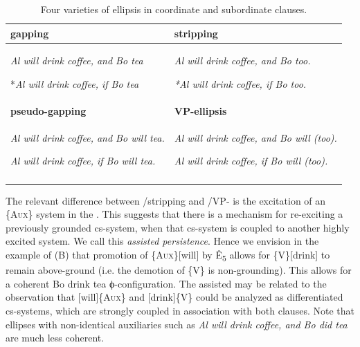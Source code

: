   
  
\begin{table}
\begin{tabularx}{\textwidth}{XX}
\lsptoprule
\textbf{gapping} & \textbf{stripping}\\
\midrule 

\textit{Al will drink coffee, and Bo tea}

*\textit{Al will drink coffee, if Bo tea} & \textit{Al will drink coffee, and Bo too.}

\textit{*Al will drink coffee, if Bo too.}  \\
\tablevspace

\textbf{pseudo-gapping} & \textbf{VP-ellipsis}\\
\midrule 
\textit{Al will drink coffee, and Bo will tea.}

\textit{Al will drink coffee, if Bo will tea.} & \textit{Al will drink coffee, and Bo will (too).}

\textit{Al will drink coffee, if Bo will (too).}\\
\lspbottomrule
\end{tabularx}
\caption{Four varieties of ellipsis in coordinate and subordinate clauses.}\label{tab:7:1}
\end{table}

  The relevant difference between /stripping and /VP- is the excitation of an \{A\textsc{ux}\} system in the . This suggests that there is a mechanism for re-exciting a previously grounded cs-system, when that cs-system is coupled to another highly excited system. We call this \textit{assisted persistence}. Hence we envision in the  example of {}(B) that promotion of \{A\textsc{ux}\}[will] by Ê\textsubscript{5} allows for \{V\}[drink] to remain above-ground (i.e. the demotion of \{V\} is non-grounding). This allows for a coherent {\textbar}Bo drink tea{\textbar} ϕ-configuration. The assisted  may be related to the observation that [will]\{A\textsc{ux}\} and [drink]\{V\} could be analyzed as differentiated cs-systems, which are strongly coupled in association with both clauses. Note that ellipses with non-identical auxiliaries such as \textit{Al will drink coffee, and Bo did tea} are much less coherent.

